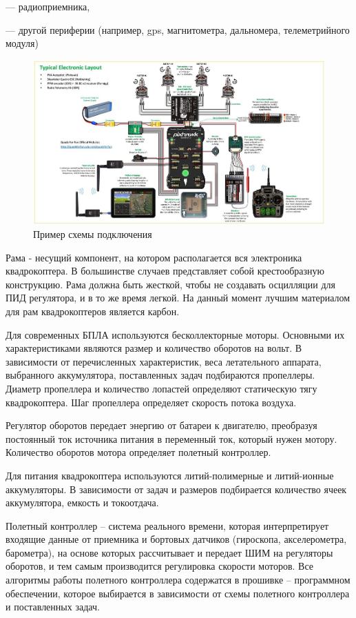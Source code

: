 --- радиоприемника,

--- другой периферии (например, gps, магнитометра, дальномера, телеметрийного модуля)

 \begin{figure}[H]
 	\centering
 	\includegraphics[width=0.9\linewidth]{pics/pix}
 	\caption{Пример схемы подключения
 	}
 	\label{fig:pix}
 \end{figure}
Рама - несущий компонент, на котором располагается вся электроника квадрокоптера. В большинстве случаев представляет собой крестообразную конструкцию. Рама должна быть жесткой, чтобы не создавать осцилляции для ПИД регулятора, и в то же время легкой. На данный момент лучшим материалом для рам квадрокоптеров является карбон.

Для современных БПЛА используются бесколлекторные моторы. Основными их характеристиками являются размер и количество оборотов на вольт. В зависимости от перечисленных характеристик, веса летательного аппарата, выбранного аккумулятора, поставленных задач подбираются пропеллеры.
Диаметр пропеллера и количество лопастей определяют статическую тягу квадрокоптера. Шаг пропеллера определяет скорость потока воздуха.

Регулятор оборотов передает энергию от батареи к двигателю, преобразуя постоянный ток источника питания в переменный ток, который нужен мотору. Количество оборотов мотора определяет полетный контроллер.

Для питания квадрокоптера используются литий-полимерные и литий-ионные аккумуляторы. В зависимости от задач и размеров подбирается количество ячеек аккумулятора, емкость и токоотдача.

Полетный контроллер -- система реального времени, которая интерпретирует входящие данные от приемника и бортовых датчиков (гироскопа, акселерометра, барометра), на основе которых рассчитывает и передает ШИМ на регуляторы оборотов, и тем самым производится регулировка скорости моторов. Все алгоритмы работы полетного контроллера содержатся в прошивке -- программном обеспечении, которое выбирается в зависимости от схемы полетного контроллера и поставленных задач.

